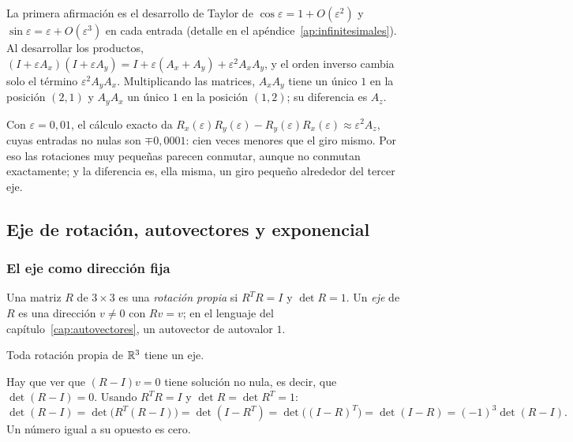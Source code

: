 \begin{demostracion}
La primera afirmación es el desarrollo de Taylor de \(\cos\varepsilon=1+O(\varepsilon^2)\) y
\(\sin\varepsilon=\varepsilon+O(\varepsilon^3)\) en cada entrada (detalle en el
apéndice~\ref{ap:infinitesimales}). Al desarrollar los productos,
\((I+\varepsilon A_x)(I+\varepsilon A_y)=I+\varepsilon(A_x+A_y)+\varepsilon^2A_xA_y\), y el
orden inverso cambia solo el término \(\varepsilon^2A_yA_x\). Multiplicando las matrices,
\(A_xA_y\) tiene un único \(1\) en la posición \((2,1)\) y \(A_yA_x\) un único \(1\) en la
posición \((1,2)\); su diferencia es \(A_z\).
\end{demostracion}

\begin{ejemplo}
Con \(\varepsilon=0{,}01\), el cálculo exacto da
\(R_x(\varepsilon)R_y(\varepsilon)-R_y(\varepsilon)R_x(\varepsilon)\approx\varepsilon^2A_z\),
cuyas entradas no nulas son \(\mp0{,}0001\): cien veces menores que el giro mismo. Por eso las
rotaciones muy pequeñas parecen conmutar, aunque no conmutan exactamente; y la diferencia es,
ella misma, un giro pequeño alrededor del tercer eje.
\end{ejemplo}

\subsection{Eje de rotación, autovectores y exponencial}\label{sec:eje-exp}

\subsubsection{El eje como dirección fija}

\begin{definicion}
Una matriz \(R\) de \(3\times3\) es una \emph{rotación propia} si \(R^TR=I\) y \(\det R=1\).
Un \emph{eje} de \(R\) es una dirección \(v\neq0\) con \(Rv=v\); en el lenguaje del
capítulo~\ref{cap:autovectores}, un autovector de autovalor \(1\).
\end{definicion}

\begin{teorema}[Euler]\label{teo:euler-eje}
Toda rotación propia de \(\mathbb{R}^3\) tiene un eje.
\end{teorema}

\begin{demostracion}
Hay que ver que \((R-I)v=0\) tiene solución no nula, es decir, que \(\det(R-I)=0\). Usando
\(R^TR=I\) y \(\det R=\det R^T=1\):
\[
\det(R-I)=\det\bigl(R^T(R-I)\bigr)=\det(I-R^T)=\det\bigl((I-R)^T\bigr)=\det(I-R)
=(-1)^3\det(R-I).
\]
Un número igual a su opuesto es cero.
\end{demostracion}

